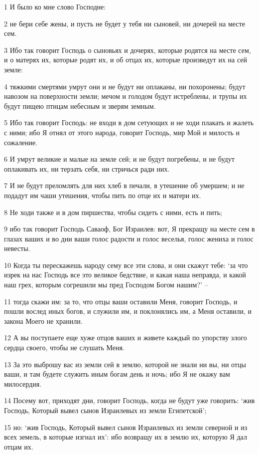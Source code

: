 \par 1 И было ко мне слово Господне:
\par 2 не бери себе жены, и пусть не будет у тебя ни сыновей, ни дочерей на месте сем.
\par 3 Ибо так говорит Господь о сыновьях и дочерях, которые родятся на месте сем, и о матерях их, которые родят их, и об отцах их, которые произведут их на сей земле:
\par 4 тяжкими смертями умрут они и не будут ни оплаканы, ни похоронены; будут навозом на поверхности земли; мечом и голодом будут истреблены, и трупы их будут пищею птицам небесным и зверям земным.
\par 5 Ибо так говорит Господь: не входи в дом сетующих и не ходи плакать и жалеть с ними; ибо Я отнял от этого народа, говорит Господь, мир Мой и милость и сожаление.
\par 6 И умрут великие и малые на земле сей; и не будут погребены, и не будут оплакивать их, ни терзать себя, ни стричься ради них.
\par 7 И не будут преломлять для них хлеб в печали, в утешение об умершем; и не подадут им чаши утешения, чтобы пить по отце их и матери их.
\par 8 Не ходи также и в дом пиршества, чтобы сидеть с ними, есть и пить;
\par 9 ибо так говорит Господь Саваоф, Бог Израилев: вот, Я прекращу на месте сем в глазах ваших и во дни ваши голос радости и голос веселья, голос жениха и голос невесты.
\par 10 Когда ты перескажешь народу сему все эти слова, и они скажут тебе: `за что изрек на нас Господь все это великое бедствие, и какая наша неправда, и какой наш грех, которым согрешили мы пред Господом Богом нашим?' --
\par 11 тогда скажи им: за то, что отцы ваши оставили Меня, говорит Господь, и пошли вослед иных богов, и служили им, и поклонялись им, а Меня оставили, и закона Моего не хранили.
\par 12 А вы поступаете еще хуже отцов ваших и живете каждый по упорству злого сердца своего, чтобы не слушать Меня.
\par 13 За это выброшу вас из земли сей в землю, которой не знали ни вы, ни отцы ваши, и там будете служить иным богам день и ночь; ибо Я не окажу вам милосердия.
\par 14 Посему вот, приходят дни, говорит Господь, когда не будут уже говорить: `жив Господь, Который вывел сынов Израилевых из земли Египетской';
\par 15 но: `жив Господь, Который вывел сынов Израилевых из земли северной и из всех земель, в которые изгнал их': ибо возвращу их в землю их, которую Я дал отцам их.
